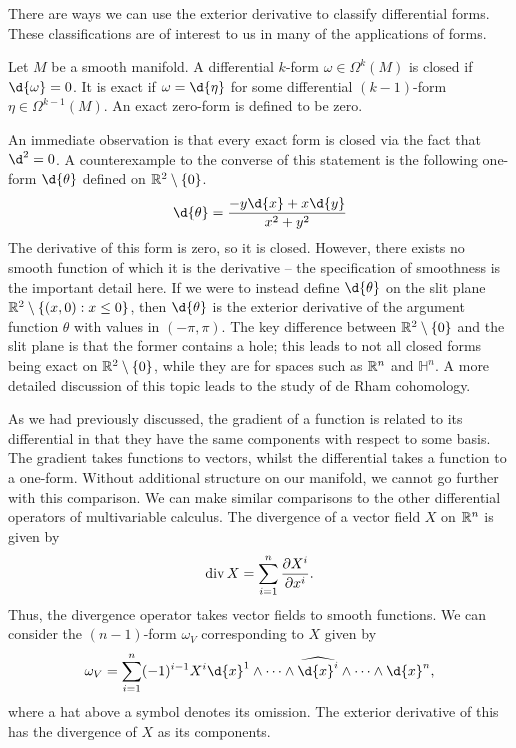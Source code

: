 \documentclass[a4paper,12pt]{article}
\begin{document}
There are ways we can use the exterior derivative to classify differential forms.
These classifications are of interest to us in many of the applications of forms.
\begin{definition}\label{def:closed_and_exact_differential_forms}
    Let $M$ be a smooth manifold.
    A differential $k$-form $\omega \in \Omega^k(M)$ is closed if $\d{\omega} = 0$.
    It is exact if $\omega = \d{\eta}$ for some differential $(k-1)$-form $\eta \in \Omega^{k-1}(M)$.
    An exact zero-form is defined to be zero.
\end{definition}
An immediate observation is that every exact form is closed via the fact that $\d^2 = 0$.
A counterexample to the converse of this statement is the following one-form $\d{\theta}$ defined on $\mathbb{R}^2 \setminus \{0\}$.
\begin{equation}\label{eq:angle-form}
    \d{\theta} = \frac{-y \d{x} + x \d{y}}{x^2 + y^2}
\end{equation}
The derivative of this form is zero, so it is closed.
However, there exists no smooth function of which it is the derivative -- the specification of smoothness is the important detail here.
If we were to instead define $\d{\theta}$ on the slit plane $\mathbb{R}^2 \setminus \{(x, 0) : x \leq 0\}$, then $\d{\theta}$ is the exterior derivative of the argument function $\theta$ with values in $(-\pi, \pi)$.
The key difference between $\mathbb{R}^2 \setminus \{0\}$ and the slit plane is that the former contains a hole; this leads to not all closed forms being exact on $\mathbb{R}^2 \setminus \{0\}$, while they are for spaces such as $\mathbb{R}^n$ and $\mathbb{H}^n$.
A more detailed discussion of this topic leads to the study of de Rham cohomology.

As we had previously discussed, the gradient of a function is related to its differential in that they have the same components with respect to some basis.
The gradient takes functions to vectors, whilst the differential takes a function to a one-form.
Without additional structure on our manifold, we cannot go further with this comparison.
We can make similar comparisons to the other differential operators of multivariable calculus.
The divergence of a vector field $X$ on $\mathbb{R}^n$ is given by
\begin{equation}
    \operatorname{div} X = \sum_{i=1}^n \frac{\partial X^i}{\partial x^i}.
\end{equation}
Thus, the divergence operator takes vector fields to smooth functions.
We can consider the $(n-1)$-form $\omega_V$ corresponding to $X$ given by
\begin{equation}
    \omega_V = \sum_{i=1}^n (-1)^{i-1} X^i \d{x}^1 \wedge \cdots \wedge \widehat{\d{x}^i} \wedge \cdots \wedge \d{x}^n,
\end{equation}
where a hat above a symbol denotes its omission.
The exterior derivative of this has the divergence of $X$ as its components.
\end{document}

